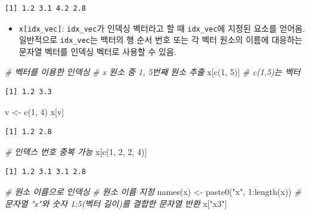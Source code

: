 \documentclass[
  11pt,
]{krantz}
\newenvironment{Shaded}{\begin{snugshade}}{\end{snugshade}}
\newcommand{\CommentTok}[1]{\textcolor[rgb]{0.37,0.37,0.37}{\textit{#1}}}
\newcommand{\DecValTok}[1]{\textcolor[rgb]{0.06,0.06,0.06}{#1}}
\newcommand{\FunctionTok}[1]{\textcolor[rgb]{0,0,0}{#1}}
\newcommand{\NormalTok}[1]{#1}
\newcommand{\OtherTok}[1]{\textcolor[rgb]{0.37,0.37,0.37}{#1}}
\newcommand{\SpecialCharTok}[1]{\textcolor[rgb]{0,0,0}{#1}}
\newcommand{\StringTok}[1]{\textcolor[rgb]{0.5,0.5,0.5}{#1}}
\providecommand{\tightlist}{%
  \setlength{\itemsep}{0pt}\setlength{\parskip}{0pt}}
\begin{document}
\begin{verbatim}
[1] 1.2 3.1 4.2 2.8
\end{verbatim}

\normalsize

\begin{itemize}
\tightlist
\item
  \texttt{x{[}idx\_vec{]}}: \texttt{idx\_vec}가 인덱싱 벡터라고 할 때 \texttt{idx\_vec}에 지정된 요소를 얻어옴. 일반적으로 \texttt{idx\_vec}는 백터의 행 순서 번호 또는 각 벡터 원소의 이름에 대응하는 문자열 벡터를 인덱싱 벡터로 사용할 수 있음.
\end{itemize}

\footnotesize

\begin{Shaded}
\begin{Highlighting}[]
\CommentTok{\# 벡터를 이용한 인덱싱}
\CommentTok{\# x 원소 중 1, 5번째 원소 추출}
\NormalTok{x[}\FunctionTok{c}\NormalTok{(}\DecValTok{1}\NormalTok{, }\DecValTok{5}\NormalTok{)] }\CommentTok{\# c(1,5)는 벡터}
\end{Highlighting}
\end{Shaded}

\begin{verbatim}
[1] 1.2 3.3
\end{verbatim}

\begin{Shaded}
\begin{Highlighting}[]
\NormalTok{v }\OtherTok{\textless{}{-}} \FunctionTok{c}\NormalTok{(}\DecValTok{1}\NormalTok{, }\DecValTok{4}\NormalTok{)}
\NormalTok{x[v]}
\end{Highlighting}
\end{Shaded}

\begin{verbatim}
[1] 1.2 2.8
\end{verbatim}

\begin{Shaded}
\begin{Highlighting}[]
\CommentTok{\# 인덱스 번호 중복 가능}
\NormalTok{x[}\FunctionTok{c}\NormalTok{(}\DecValTok{1}\NormalTok{, }\DecValTok{2}\NormalTok{, }\DecValTok{2}\NormalTok{, }\DecValTok{4}\NormalTok{)]}
\end{Highlighting}
\end{Shaded}

\begin{verbatim}
[1] 1.2 3.1 3.1 2.8
\end{verbatim}

\begin{Shaded}
\begin{Highlighting}[]
\CommentTok{\# 원소 이름으로 인덱싱}
\CommentTok{\# 원소 이름 지정}
\FunctionTok{names}\NormalTok{(x) }\OtherTok{\textless{}{-}} \FunctionTok{paste0}\NormalTok{(}\StringTok{"x"}\NormalTok{, }\DecValTok{1}\SpecialCharTok{:}\FunctionTok{length}\NormalTok{(x)) }\CommentTok{\# 문자열 "x"와 숫자 1:5(벡터 길이)를 결합한 문자열 반환}
\NormalTok{x[}\StringTok{"x3"}\NormalTok{]}
\end{Highlighting}
\end{Shaded}
\end{document}
